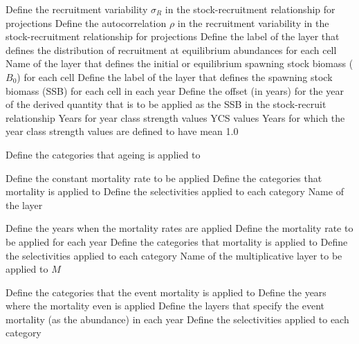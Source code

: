  {Define the recruitment variability $\sigma_R$ in the stock-recruitment relationship for projections}
 {Define the autocorrelation $\rho$ in the recruitment variability in the stock-recruitment relationship for projections}
 {Define the label of the layer that defines the distribution of recruitment at equilibrium abundances for each cell}
 {Name of the layer that defines the initial or equilibrium spawning stock biomass ($B_0$) for each cell}
 {Define the label of the layer that defines the spawning stock biomass (SSB) for each cell in each year}
 {Define the offset (in years) for the year of the derived quantity that is to be applied as the SSB in the stock-recruit relationship}
 {Years for year class strength values}
 {YCS values}
 {Years for which the year class strength values are defined to have mean 1.0}
\par\textbf{}\par
{} {Define the categories that ageing is applied to}
\par\textbf{}\par
{} {Define the constant mortality rate to be applied}
 {Define the categories that mortality is applied to}
 {Define the selectivities applied to each category}
 {Name of the layer}
\par\textbf{}\par
{} {Define the years when the mortality rates are applied}
 {Define the mortality rate to be applied for each year}
 {Define the categories that mortality is applied to}
 {Define the selectivities applied to each category}
 {Name of the multiplicative layer to be applied to $M$}
\par\textbf{}\par
{} {Define the categories that the event mortality is applied to}
 {Define the years where the mortality even is applied}
 {Define the layers that specify the event mortality (as the abundance) in each year}
 {Define the selectivities applied to each category}
